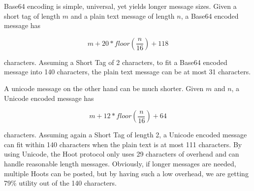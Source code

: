 Base64 encoding is simple, universal, yet yields longer message sizes. Given a short tag of length $m$ and a plain text message of length $n$, a Base64 encoded message has

\begin{equation*}
	m + 20 * \mathit{floor}\left(\frac{n}{16}\right) + 118
\end{equation*}

characters. Assuming a Short Tag of 2 characters, to fit a Base64 encoded message into 140 characters, the plain text message can be at most 31 characters.

A unicode message on the other hand can be much shorter. Given $m$ and $n$, a Unicode encoded message has

\begin{equation*}
	m + 12 * \mathit{floor}\left(\frac{n}{16}\right) + 64
\end{equation*}

characters. Assuming again a Short Tag of length 2, a Unicode encoded message can fit within 140 characters when the plain text is at most 111 characters. By using Unicode, the Hoot protocol only uses 29 characters of overhead and can handle reasonable length messages. Obviously, if longer messages are needed, multiple Hoots can be posted, but by having such a low overhead, we are getting 79\% utility out of the 140 characters.
